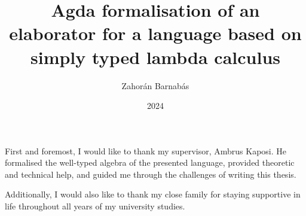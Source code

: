 \documentclass[
]{elteikthesis}[2023/04/10]
\title{Agda formalisation of an elaborator for a language based on simply typed lambda calculus} %
\date{2024} %
\author{Zahorán Barnabás}
\affiliation{Associate professor} %
\begin{document}


\maketitle
%

\tableofcontents
\cleardoublepage


\cleardoublepage


\cleardoublepage


\cleardoublepage


\cleardoublepage


\cleardoublepage

\chapter*{\acklabel}
First and foremost, I would like to thank my supervisor, Ambrus Kaposi. He formalised the well-typed algebra of the presented language, provided theoretic and technical help, and guided me through the challenges of writing this thesis.

Additionally, I would also like to thank my close family for staying supportive in life throughout all years of my university studies.

%

{}
\printbibliography[title=\biblabel]
\cleardoublepage




{}
\lstlistoflistings
\cleardoublepage

\printnomenclature
\end{document}
